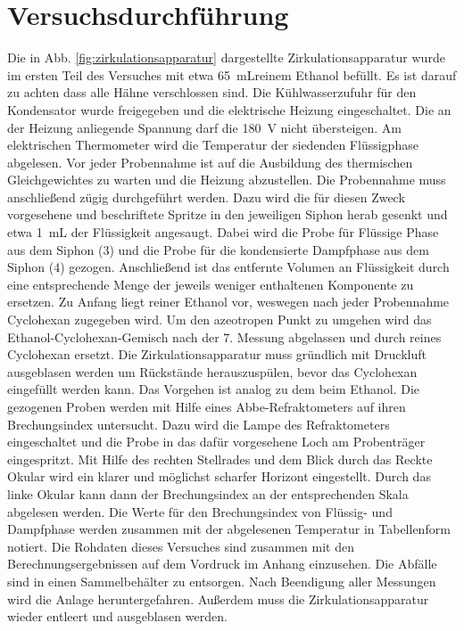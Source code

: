 \section{Versuchsdurchführung}
\label{sec:durchfuerung}

Die in Abb. \ref{fig:zirkulationsapparatur} dargestellte Zirkulationsapparatur wurde im ersten Teil des Versuches mit etwa \SI{65}{\milli\liter}reinem Ethanol befüllt. Es ist darauf zu achten dass alle Hähne verschlossen sind. Die Kühlwasserzufuhr für den Kondensator wurde freigegeben und die elektrische Heizung eingeschaltet. Die an der Heizung anliegende Spannung darf die \SI{180}{\volt } nicht übersteigen. Am elektrischen Thermometer wird die Temperatur der siedenden Flüssigphase abgelesen. Vor jeder Probennahme ist auf die Ausbildung des thermischen Gleichgewichtes zu warten und die Heizung abzustellen. Die Probennahme muss anschließend zügig durchgeführt werden. Dazu wird die für diesen Zweck vorgesehene und beschriftete Spritze in den jeweiligen Siphon herab gesenkt und etwa \SI{1}{\milli\liter} der Flüssigkeit angesaugt. Dabei wird die Probe für Flüssige Phase aus dem Siphon (3) und die Probe für die kondensierte Dampfphase aus dem Siphon (4) gezogen. Anschließend ist das entfernte Volumen an Flüssigkeit durch eine entsprechende Menge der jeweils weniger enthaltenen Komponente zu ersetzen. Zu Anfang liegt reiner Ethanol vor, weswegen nach jeder Probennahme Cyclohexan zugegeben wird. Um den azeotropen Punkt zu umgehen wird das Ethanol-Cyclohexan-Gemisch nach der 7. Messung abgelassen und durch reines Cyclohexan ersetzt. Die Zirkulationsapparatur muss gründlich mit Druckluft ausgeblasen werden um Rückstände herauszuspülen, bevor das Cyclohexan eingefüllt werden kann. Das Vorgehen ist analog zu dem beim Ethanol. Die gezogenen Proben werden mit Hilfe eines Abbe-Refraktometers auf ihren Brechungsindex untersucht. Dazu wird die Lampe des Refraktometers eingeschaltet und die Probe in das dafür vorgesehene Loch am Probenträger eingespritzt. Mit Hilfe des rechten Stellrades und dem Blick durch das Reckte Okular wird ein klarer und möglichst scharfer Horizont eingestellt. Durch das linke Okular kann dann der Brechungsindex an der entsprechenden Skala abgelesen werden. Die Werte für den Brechungsindex von Flüssig- und Dampfphase werden zusammen mit der abgelesenen Temperatur in Tabellenform notiert. Die Rohdaten dieses Versuches sind zusammen mit den Berechnungsergebnissen auf dem Vordruck im Anhang einzusehen.
Die Abfälle sind in einen Sammelbehälter zu entsorgen. Nach Beendigung aller Messungen wird die Anlage heruntergefahren. Außerdem muss die Zirkulationsapparatur wieder entleert und ausgeblasen werden.
